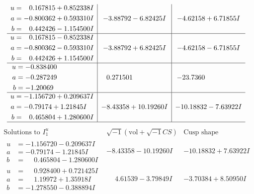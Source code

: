 \documentclass[1p]{elsarticle_modified}
\theoremstyle{definition}
\newcommand{\I}{\sqrt{-1}}
\begin{document}
$$\begin{array}{c|c|c}
\begin{aligned}
u &= \phantom{-}0.167815 + 0.852338 I \\
a &= -0.800362 + 0.593310 I \\
b &= \phantom{-}0.442426 - 1.154500 I\end{aligned}
 & -3.88792 - 6.82425 I & -4.62158 + 6.71855 I \\ \hline\begin{aligned}
u &= \phantom{-}0.167815 - 0.852338 I \\
a &= -0.800362 - 0.593310 I \\
b &= \phantom{-}0.442426 + 1.154500 I\end{aligned}
 & -3.88792 + 6.82425 I & -4.62158 - 6.71855 I \\ \hline\begin{aligned}
u &= -0.838400\phantom{ +0.000000I} \\
a &= -0.287249\phantom{ +0.000000I} \\
b &= -1.20069\phantom{ +0.000000I}\end{aligned}
 & \phantom{-}0.271501\phantom{ +0.000000I} & -23.7360\phantom{ +0.000000I} \\ \hline\begin{aligned}
u &= -1.156720 + 0.209637 I \\
a &= -0.79174 + 1.21845 I \\
b &= \phantom{-}0.465804 + 1.280600 I\end{aligned}
 & -8.43358 + 10.19260 I & -10.18832 - 7.63922 I\\
 \hline 
 \end{array}$$\newpage$$\begin{array}{c|c|c}  
\text{Solutions to }I^u_{1}& \I (\text{vol} + \sqrt{-1}CS) & \text{Cusp shape}\\
 \hline 
\begin{aligned}
u &= -1.156720 - 0.209637 I \\
a &= -0.79174 - 1.21845 I \\
b &= \phantom{-}0.465804 - 1.280600 I\end{aligned}
 & -8.43358 - 10.19260 I & -10.18832 + 7.63922 I \\ \hline\begin{aligned}
u &= \phantom{-}0.928400 + 0.721425 I \\
a &= \phantom{-}1.19972 + 1.35918 I \\
b &= -1.278550 - 0.388894 I\end{aligned}
 & \phantom{-}4.61539 - 3.79849 I & -3.70384 + 8.50950 I \\ \hline\begin{aligned}

\end{aligned}
\end{array}$$
\end{document}
